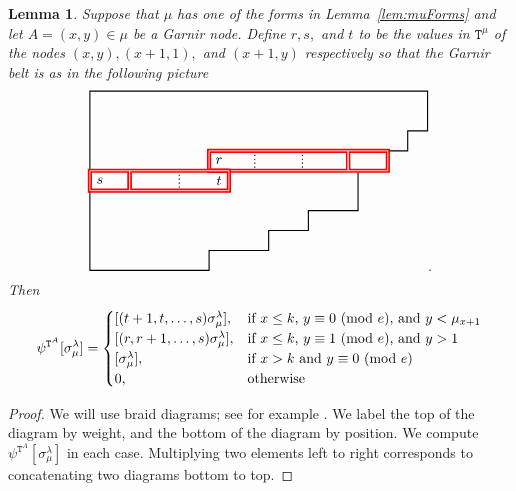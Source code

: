 \documentclass[twoside,11pt,reqno,letter]{amsart}
\numberwithin{equation}{section}
\newtheorem{Lemma}[equation]{Lemma}
\theoremstyle{definition}  %
\newcommand{\0}{{\bar 0}}
\newcommand{\1}{{\bar 1}}
\newcommand{\la}{\lambda}
\newcommand{\si}{\sigma}
\def\T{{\mathtt T}}
\begin{document}
{\begin{Lemma}\label{lem:GarnirPsi}
  Suppose that $\mu$ has one of the forms in Lemma~\ref{lem:muForms} and let $A = (x,y) \in \mu$ be a Garnir node. Define $r, s,$ and $t$ to be the values in $\T^\mu$ of the nodes $(x,y), (x+1,1),$ and $(x+1,y)$ respectively so that the Garnir belt is as in the following picture
\[
  \begin{tikzpicture}[scale=0.5,draw/.append style={thick,black}]
    \draw (0.5,-0.5)--++(17,0)--++(0,-2)--++(-1,0)--++(0,-1)--++(-1,0)--++(0,-1)--++(-1.5,0)
            --++(0,-2)--++(-2.5,0)--++(0,-1)--++(-2,0)--++(0,-1)--++(-3,0)--++(0,-1)--++(-6,-0)--cycle;
    \draw[red,double,very thick] (6.5,-4.5)--++(1,0);
    \draw[red,double,very thick] (13.5,-3.5)--++(0,-1);
    \draw[dotted] (8.8,-3.5)--++(0,-1);
    \draw[dotted] (11.2,-3.5)--++(0,-1);
    \draw[red,double,very thick] (2.5,-4.5)--++(0,-1);
    \draw[dotted] (5,-4.5)--++(0,-1);
    \draw[red,double,very thick]
       (6.5,-3.5)rectangle++(7,-1)rectangle++(2,1);
    \draw[red,double,very thick]
       (0.5,-4.5)rectangle++(2,-1)rectangle++(5,1);
    \draw (7,-4) node {$r$};
    \draw (1,-5) node {$s$};
    \draw (7,-5) node {$t$};
  \end{tikzpicture}.
\]
  Then
  \[ 
    \psi^{\T^A} [\si^\la_\mu] = \begin{cases}
      [(t+1, t, \dots, s) \si^\la_\mu],& \textup{if $x \leq k$, $y \equiv 0$ (mod $e$), and $y < \mu_{x+1}$} \\
      [(r, r+1, \dots, s) \si^\la_\mu],& \textup{if $x \leq k$, $y \equiv 1$ (mod $e$), and $y > 1$} \\
      [\si^\la_\mu],& \textup{if $x > k$ and $y \equiv 0$ (mod $e$)} \\
      0,& \textup{otherwise} \\
    \end{cases}
  \]
\end{Lemma}









\begin{proof}
  We will use braid diagrams; see for example \cite{KMR}. We label the top of the diagram by weight, and the bottom of the diagram by position. We compute $\psi^{\T^A}[\si^\la_\mu]$ in each case. Multiplying two elements left to right corresponds to concatenating two diagrams bottom to top.
  

\end{proof}}
\end{document}
